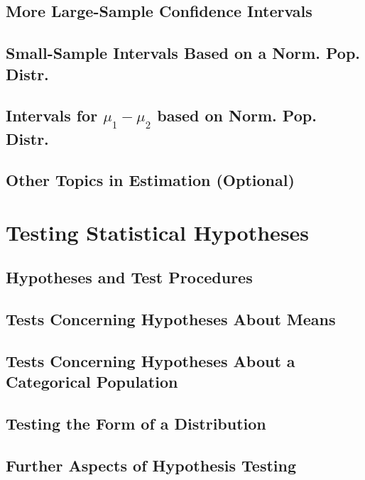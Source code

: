 \documentclass{article}
\begin{document}
	\subsection{More Large-Sample Confidence Intervals} %
	
	\subsection{Small-Sample Intervals Based on a Norm. Pop. Distr.} %
	
	\subsection{Intervals for $\mu_1 - \mu_2$ based on Norm. Pop. Distr.} %
	
	\subsection{Other Topics in Estimation (Optional)} %

\clearpage	
\section{Testing Statistical Hypotheses} %

	\subsection{Hypotheses and Test Procedures} %
	
	\subsection{Tests Concerning Hypotheses About Means} %
	
	\subsection{Tests Concerning Hypotheses About a Categorical Population} %
	
	\subsection{Testing the Form of a Distribution} %
	
	\subsection{Further Aspects of Hypothesis Testing} %
\end{document}
